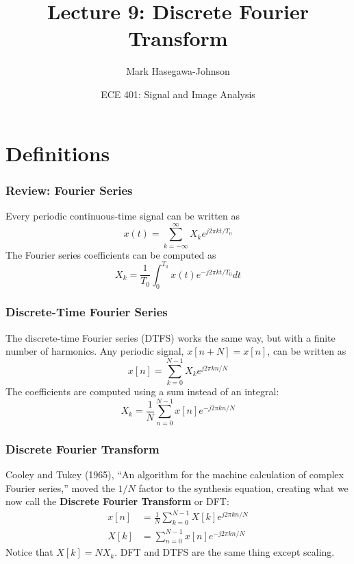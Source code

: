 \documentclass{beamer}
\title{Lecture 9: Discrete Fourier Transform}
\author{Mark Hasegawa-Johnson}
\date{ECE 401: Signal and Image Analysis}
\begin{document}
\begin{frame}
  \maketitle
\end{frame}

\begin{frame}
  \tableofcontents
\end{frame}

\section[Definitions]{Definitions}
\setcounter{subsection}{1}

\begin{frame}
  \frametitle{Review: Fourier Series}
  Every periodic continuous-time signal can be written as
  \[
  x(t) = \sum_{k=-\infty}^\infty X_k e^{j2\pi kt/T_0}
  \]
  The Fourier series coefficients can be computed as
  \[
  X_k = \frac{1}{T_0}\int_0^{T_0} x(t)e^{-j2\pi kt/T_0}dt
  \]
\end{frame}  
        
\begin{frame}
  \frametitle{Discrete-Time Fourier Series}

  The discrete-time Fourier series (DTFS) works the same way, but with
  a finite number of harmonics.  Any periodic signal, $x[n+N] = x[n]$,
  can be written as
  \[
  x[n] = \sum_{k=0}^{N-1} X_k e^{j2\pi k n/N}
  \]
  The coefficients are computed using a sum instead of an integral:
  \[ 
  X_k = \frac{1}{N}\sum_{n=0}^{N-1} x[n]e^{-j2\pi kn/N}
  \]
\end{frame}

\begin{frame}
  \frametitle{Discrete Fourier Transform}

  Cooley and Tukey (1965), ``An algorithm for the machine calculation
  of complex Fourier series,'' moved the $1/N$ factor to the synthesis
  equation, creating what we now call the \textbf{Discrete Fourier
    Transform} or DFT:
  \begin{align*}
    x[n] &= \frac{1}{N}\sum_{k=0}^{N-1} X[k] e^{j2\pi k n/N}\\
    X[k] &= \sum_{n=0}^{N-1} x[n]e^{-j2\pi kn/N}
  \end{align*}
  Notice that $X[k]=NX_k$.  DFT and DTFS are the same thing except
  scaling.
\end{frame}
\end{document}
